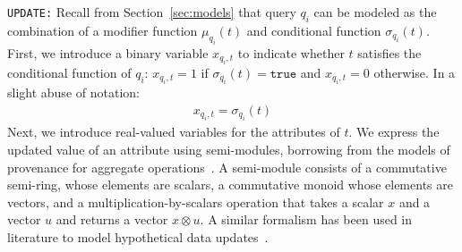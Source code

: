 \smallskip
\noindent
\texttt{UPDATE:}
Recall from Section~\ref{sec:models} that query $q_i$ can be modeled
as the combination of a modifier function $\mu_{q_i}(t)$ and
conditional function $\sigma_{q_i}(t)$. First, we introduce a binary
variable $x_{q_i, t}$ to indicate whether $t$ satisfies the
conditional function of $q_i$: $x_{q_i, t}=1$ if
$\sigma_{q_i}(t)=\texttt{true}$ and $x_{q_i, t}=0$ otherwise. In a
slight abuse of notation:
\begin{align}
\label{eq:x}
x_{q_i, t} = \sigma_{q_i}(t)
\end{align}
Next, we introduce real-valued variables for the attributes of $t$.
We express the updated value
of an attribute using semi-modules, borrowing from the models of
provenance for aggregate operations~\cite{Amsterdamer2011}. A
semi-module consists of a commutative semi-ring, whose elements are
scalars, a commutative monoid whose elements are vectors, and a
multiplication-by-scalars operation that takes a scalar $x$ and a
vector $u$ and returns a vector $x \otimes u$. A similar formalism has
been used in literature to model hypothetical data
updates~\cite{tiresias}.

